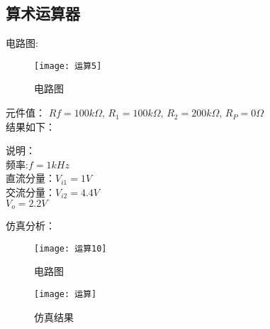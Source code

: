 \documentclass{../source/Experiment}
\begin{document}
            \subsection{算术运算器}
            电路图:
            \begin{figure}[h]
                \centering
                \texttt{[image: 运算5]}
                \caption{电路图}
            \end{figure}
            元件值：
            $Rf = 100k\Omega,\,R_1 = 100k\Omega,\,R_2 = 200k\Omega,\,R_P = 0\Omega$\\
            结果如下：\\
            \begin{figure}[h]
                \centering
                \subfigure[拍照]{
                    \texttt{[image: 运算8]}
                }
                \subfigure[草图]{
                \texttt{[image: 运算9]}
                }
            \end{figure}
            说明：\\
            频率:$f = 1kHz$\\
            直流分量：$V_{i1} = 1V$\\
            交流分量：$V_{i2} = 4.4V$\\
            $V_o = 2.2V$ \par 
            仿真分析：\\
            \begin{figure}[h]
                \centering
                \texttt{[image: 运算10]}
                \caption{电路图}
                \texttt{[image: 运算]}
                \caption{仿真结果}
            \end{figure}
\end{document}
